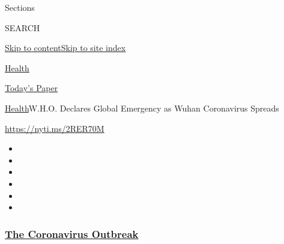 Sections

SEARCH

\protect\hyperlink{site-content}{Skip to
content}\protect\hyperlink{site-index}{Skip to site index}

\href{https://www.nytimes3xbfgragh.onion/section/health}{Health}

\href{https://myaccount.nytimes3xbfgragh.onion/auth/login?response_type=cookie\&client_id=vi}{}

\href{https://www.nytimes3xbfgragh.onion/section/todayspaper}{Today's
Paper}

\href{/section/health}{Health}\textbar{}W.H.O. Declares Global Emergency
as Wuhan Coronavirus Spreads

\url{https://nyti.ms/2RER70M}

\begin{itemize}
\item
\item
\item
\item
\item
\item
\end{itemize}

\hypertarget{the-coronavirus-outbreak}{%
\subsubsection{\texorpdfstring{\href{https://www.nytimes3xbfgragh.onion/news-event/coronavirus?name=styln-coronavirus-national\&region=TOP_BANNER\&variant=undefined\&block=storyline_menu_recirc\&action=click\&pgtype=Article\&impression_id=3d2d1630-e3a7-11ea-974d-d37311179bca}{The
Coronavirus
Outbreak}}{The Coronavirus Outbreak}}\label{the-coronavirus-outbreak}}

